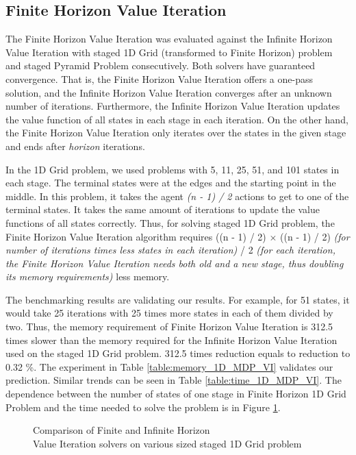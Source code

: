 \subsection{Finite Horizon Value Iteration}
The Finite Horizon Value Iteration was evaluated against the Infinite Horizon Value Iteration with staged 1D Grid (transformed to Finite Horizon) problem and staged Pyramid Problem consecutively. Both solvers have guaranteed convergence. That is, the Finite Horizon Value Iteration offers a one-pass solution, and the Infinite Horizon Value Iteration converges after an unknown number of iterations. Furthermore, the Infinite Horizon Value Iteration updates the value function of all states in each stage in each iteration. On the other hand, the Finite Horizon Value Iteration only iterates over the states in the given stage and ends after \textit{horizon} iterations.

In the 1D Grid problem, we used problems with 5, 11, 25, 51, and 101 states in each stage. The terminal states were at the edges and the starting point in the middle. In this problem, it takes the agent \textit{(n - 1) / 2} actions to get to one of the terminal states. It takes the same amount of iterations to update the value functions of all states correctly. Thus, for solving staged 1D Grid problem, the Finite Horizon Value Iteration algorithm requires ((n - 1) / 2) $\times$ ((n - 1) / 2) \textit{(for number of iterations times less states in each iteration)} / 2 \textit{(for each iteration, the Finite Horizon Value Iteration needs both old and a new stage, thus doubling its memory requirements)} less memory. 

The benchmarking results are validating our results. For example, for 51 states, it would take 25 iterations with 25 times more states in each of them divided by two. Thus, the memory requirement of Finite Horizon Value Iteration is 312.5 times slower than the memory required for the Infinite Horizon Value Iteration used on the staged 1D Grid problem. 312.5 times reduction equals to reduction to 0.32 \%. The experiment in Table \ref{table:memory_1D_MDP_VI} validates our prediction. Similar trends can be seen in Table \ref{table:time_1D_MDP_VI}. The dependence between the number of states of one stage in Finite Horizon 1D Grid Problem and the time needed to solve the problem is in Figure \ref{graph1}.



\begin{figure}[ht]
\centering
{}
\caption{Comparison of Finite and Infinite Horizon \\ Value Iteration solvers on various sized staged 1D Grid problem}
\label{graph1}
\end{figure}


